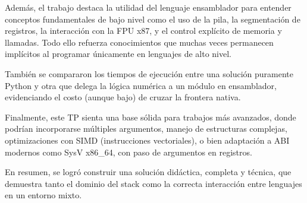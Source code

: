 \documentclass[a4paper,12pt]{article}
\begin{document}
Además, el trabajo destaca la utilidad del lenguaje ensamblador para entender conceptos fundamentales de bajo nivel como el uso de la pila, la segmentación de registros, la interacción con la FPU x87, y el control explícito de memoria y llamadas. Todo ello refuerza conocimientos que muchas veces permanecen implícitos al programar únicamente en lenguajes de alto nivel.

También se compararon los tiempos de ejecución entre una solución puramente Python y otra que delega la lógica numérica a un módulo en ensamblador, evidenciando el costo (aunque bajo) de cruzar la frontera nativa.

Finalmente, este TP sienta una base sólida para trabajos más avanzados, donde podrían incorporarse múltiples argumentos, manejo de estructuras complejas, optimizaciones con SIMD (instrucciones vectoriales), o bien adaptación a ABI modernos como SysV x86\_64, con paso de argumentos en registros.

En resumen, se logró construir una solución didáctica, completa y técnica, que demuestra tanto el dominio del stack como la correcta interacción entre lenguajes en un entorno mixto.
\end{document}
